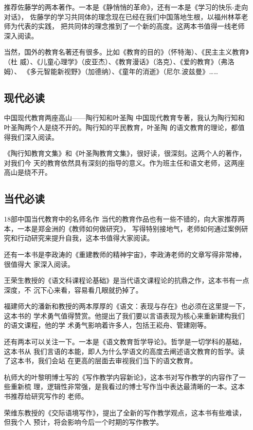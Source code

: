\documentclass[11pt]{ctexart}
\begin{document}
{{{{推荐佐藤学的两本著作。一本是《静悄悄的革命》，还有一本是《学习的快乐-走向对话》，
佐藤学的学习共同体的理念现在已经在我们中国落地生根，以福州林莘老师为代表的实践，
把共同体的理念推到了一个新的高度。这两本书值得一线老师深入阅读。

当然，国外的教育名著还有很多。比如《教育的目的》（怀特海）、《民主主义教育》（杜
威）、《儿童心理学》（皮亚杰）、《教育漫话》（洛克）、《爱的教育》（弗洛姆）、
《多元智能新视野》（加德纳）、《童年的消逝》（尼尔.波兹曼》……

\subsection{现代必读}
\label{sec:orgc406101}
中国现代教育两座高山——陶行知和叶圣陶
中国现代教育专著，我认为陶行知和叶圣陶两个人是绕不开的。陶行知的平民教育，叶圣陶
的语文教育的理论，都值得我们深入阅读。

《陶行知教育文集》和《叶圣陶教育文集》，很好读，很深刻。这两个人的著作，对我们今
天的教育依然具有深刻的指导的意义。作为班主任和语文老师，这两座高山是绕不开。

\subsection{当代必读}
\label{sec:orgeb8e053}
18部中国当代教育中的名师名作
当代的教育作品也有一些不错的，向大家推荐两本，一本是郑金洲的《教师如何做研究》，
写得特别接地气，老师如何通过案例研究和行动研究来提升自我，这本书值得大家阅读。

还有一本书是李政涛的《重建教师的精神宇宙》，李政涛老师的文章写得非常棒，很值得大
家深入阅读。

王荣生教授的《语文科课程论基础》是当代语文课程论的抗鼎之作，这本书有一点深度，不
沉下心来看，容易看几眼就扔掉了。

福建师大的潘新和教授的两本厚厚的《语文：表现与存在》也必须在这里提一下，这本书的
学术勇气值得赞赏。他提出了我们要以言语表现为核心来重新建构我们的语文课程，他的学
术勇气影响着许多人，包括王崧舟、管建刚等。

还有两本可以关注一下。一本是《语文教育哲学导论》。哲学是一切学科的基础，这本书从
我们言语的本能，即人为什么学语文的高度去阐述语文教育的哲学。读了这本书，我们会站
在更高的层面去审视我们当下的语文教育。

杭师大的叶黎明博士写的《写作教学内容新论》，这本书对写作教学的内容作了一些重新梳
理，逻辑性非常强，是我看过的博士写作当中表达最清晰的一本。这本书推荐给研究写作的
老师。

荣维东教授的《交际语境写作》，提出了全新的写作教学观点，这本书有些难读，但我个人
预计，将会影响今后一个时期的写作教学。

}}}}
\end{document}
